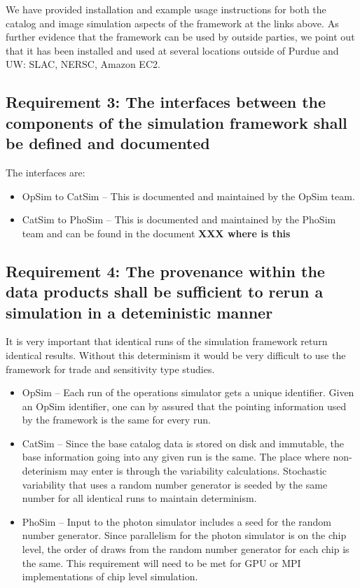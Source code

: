 \documentclass[]{article}
\begin{document}
We have provided installation and example usage instructions for both the catalog and image simulation
aspects of the framework at the links above.  As further evidence that the framework can be used
by outside parties, we point out that it has been installed and used at several locations outside 
of Purdue and UW: SLAC, NERSC, Amazon EC2.

\subsection{Requirement 3: The interfaces between the components of the simulation framework shall be defined 
and documented}
The interfaces are:
\begin{itemize}
\item OpSim to CatSim -- This is documented and maintained by the OpSim team.
\item CatSim to PhoSim -- This is documented and maintained by the PhoSim team and can be found in the document
{\bf XXX where is this}
\end{itemize}

\subsection{Requirement 4: The provenance within the data products shall be sufficient to rerun a simulation in a 
deteministic manner}
It is very important that identical runs of the simulation framework return identical results.  Without this determinism 
it would be very difficult to use the framework for trade and sensitivity type studies.
\begin{itemize}
\item OpSim -- Each run of the operations simulator gets a unique identifier.  Given an OpSim identifier, one can by 
assured that the pointing information used by the framework is the same for every run.
\item CatSim -- Since the base catalog data is stored on disk and immutable, the base information
going into any given run is the same.  The place where non-deterinism may enter is through the variability calculations.
Stochastic variability that uses a random number generator is seeded by the same number for all identical runs to
maintain determinism.
\item PhoSim -- Input to the photon simulator includes a seed for the random number generator.  Since parallelism for
the photon simulator is on the chip level, the order of draws from the random number generator for each chip is the same.
This requirement will need to be met for GPU or MPI implementations of chip level simulation.
\end{itemize}
\end{document}
